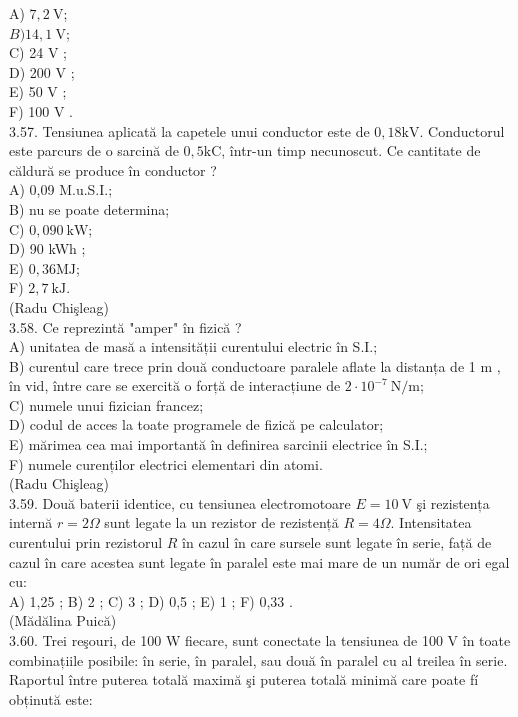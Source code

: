 \documentclass[10pt]{article}
\begin{document}
A) $7,2 \mathrm{~V}$;\\
$B) 14,1 \mathrm{~V}$;\\
C) 24 V ;\\
D) 200 V ;\\
E) 50 V ;\\
F) 100 V .\\
3.57. Tensiunea aplicată la capetele unui conductor este de $0,18 \mathrm{kV}$. Conductorul este parcurs de o sarcină de $0,5 \mathrm{kC}$, într-un timp necunoscut. Ce cantitate de căldură se produce în conductor ?\\
A) 0,09 M.u.S.I.;\\
B) nu se poate determina;\\
C) $0,090 \mathrm{~kW}$;\\
D) 90 kWh ;\\
E) $0,36 \mathrm{MJ}$;\\
F) $2,7 \mathrm{~kJ}$.\\
(Radu Chişleag)\\
3.58. Ce reprezintă "amper" în fizică ?\\
A) unitatea de masă a intensității curentului electric în S.I.;\\
B) curentul care trece prin două conductoare paralele aflate la distanța de 1 m , în vid, între care se exercită o forță de interacțiune de $2 \cdot 10^{-7} \mathrm{~N} / \mathrm{m}$;\\
C) numele unui fizician francez;\\
D) codul de acces la toate programele de fizică pe calculator;\\
E) mărimea cea mai importantă în definirea sarcinii electrice în S.I.;\\
F) numele curenților electrici elementari din atomi.\\
(Radu Chişleag)\\
3.59. Două baterii identice, cu tensiunea electromotoare $E=10 \mathrm{~V}$ şi rezistența internă $r=2 \Omega$ sunt legate la un rezistor de rezistență $R=4 \Omega$. Intensitatea curentului prin rezistorul $R$ în cazul în care sursele sunt legate în serie, față de cazul în care acestea sunt legate în paralel este mai mare de un număr de ori egal cu:\\
A) 1,25 ; B) 2 ; C) 3 ; D) 0,5 ; E) 1 ; F) 0,33 .\\
(Mădălina Puică)\\
3.60. Trei reşouri, de 100 W fiecare, sunt conectate la tensiunea de 100 V în toate combinațiile posibile: în serie, în paralel, sau două în paralel cu al treilea în serie. Raportul între puterea totală maximă şi puterea totală minimă care poate fí obținută este:\\
\end{document}
